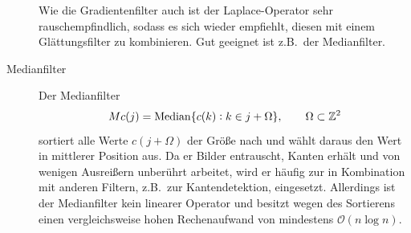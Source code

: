 \begin{example}
\begin{description}
  Wie die Gradientenfilter auch ist der Laplace-Operator sehr rauschempfindlich, sodass es sich
  wieder empfiehlt, diesen mit einem Glättungsfilter zu kombinieren. Gut geeignet ist z.B.\ der
  Medianfilter.
\item [Medianfilter] Der Medianfilter
  \[
    Mc(j) = \operatorname{Median}\{ c(k) : k \in j + \Omega \}, \qquad \Omega \subset \mathbb{Z}^{2}
  \]
  sortiert alle Werte $ c(j + \Omega) $ der Größe nach und wählt daraus den Wert in mittlerer
  Position aus. Da er Bilder entrauscht, Kanten erhält und von wenigen Ausreißern unberührt
  arbeitet, wird er häufig zur in Kombination mit anderen Filtern, z.B.\ zur Kantendetektion, 
  eingesetzt. Allerdings ist der Medianfilter kein linearer Operator und besitzt wegen des 
  Sortierens einen vergleichsweise hohen Rechenaufwand von mindestens $ \mathcal{O}(n \log n) $.
\end{description}
\end{example}